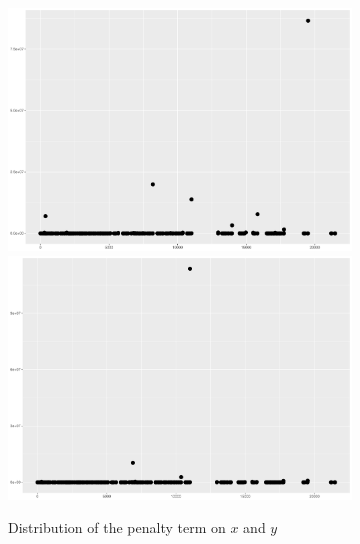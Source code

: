 \begin{figure}
    \centering
    \begin{subfigure}{\textwidth}
    \centering
    \includegraphics[width=0.45\linewidth]{Chapters/02TractorSplineTheory/plot/ggplot/ggRealdataXPenaltyLine2.pdf}
    \includegraphics[width=0.45\linewidth]{Chapters/02TractorSplineTheory/plot/ggplot/ggRealdataYPenaltyLine2.pdf}
    \caption{Distribution of the penalty term on $x$ and $y$}\label{penaltyxyggXYLine}
    \end{subfigure}
    \begin{subfigure}{\textwidth}
    \centering
{}
\end{subfigure}
\end{figure}
